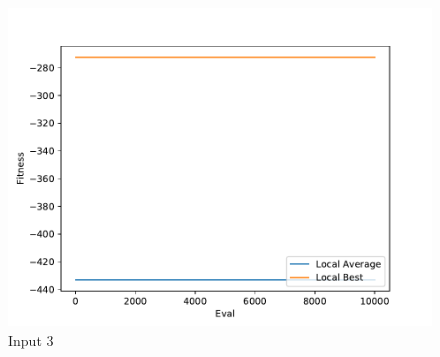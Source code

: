\documentclass{standalone}
\begin{document}
\begin{figure}[!htb]
	\caption{Input 3}
	\label{fig:graph_3018}
	\includegraphics[width=\textwidth]{../graphs/graphs/3018.pdf}
\end{figure}
\end{document}
